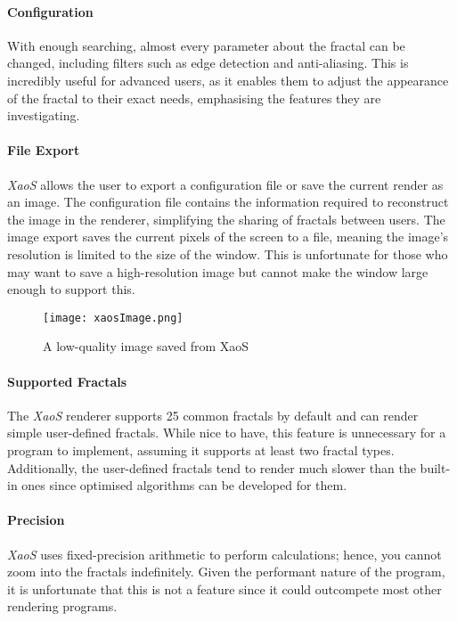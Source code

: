 \paragraph{Configuration} With enough searching, almost every parameter about the fractal can be changed, including filters such as edge detection and anti-aliasing. This is incredibly useful for advanced users, as it enables them to adjust the appearance of the fractal to their exact needs, emphasising the features they are investigating.

\paragraph{File Export} \textit{XaoS} allows the user to export a configuration file or save the current render as an image. The configuration file contains the information required to reconstruct the image in the renderer, simplifying the sharing of fractals between users. The image export saves the current pixels of the screen to a file, meaning the image's resolution is limited to the size of the window. This is unfortunate for those who may want to save a high-resolution image but cannot make the window large enough to support this.

\FloatBarrier
\begin{figure}[htp]
    \centering
    \texttt{[image: xaosImage.png]}
    \caption{A low-quality image saved from XaoS}
\end{figure}
\FloatBarrier

\paragraph{Supported Fractals} The \textit{XaoS} renderer supports 25 common fractals by default and can render simple user-defined fractals. While nice to have, this feature is unnecessary for a program to implement, assuming it supports at least two fractal types. Additionally, the user-defined fractals tend to render much slower than the built-in ones since optimised algorithms can be developed for them.

\paragraph{Precision} \textit{XaoS} uses fixed-precision arithmetic to perform calculations; hence, you cannot zoom into the fractals indefinitely. Given the performant nature of the program, it is unfortunate that this is not a feature since it could outcompete most other rendering programs.

